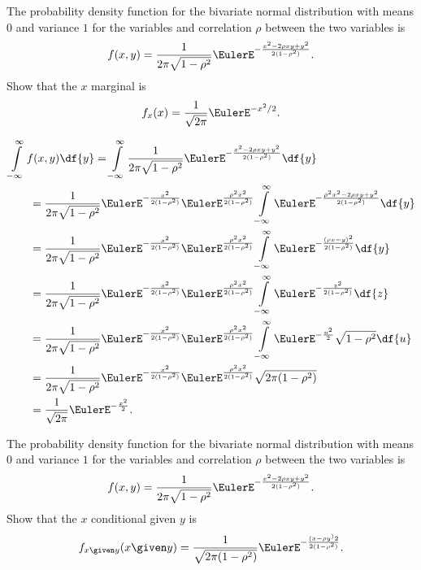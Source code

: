 \documentclass[12pt]{article}
\begin{document}
\renewcommand{\theexerciseseries}{}
\renewcommand{\theexercise}{\arabic{exercise}}

\begin{exercise}
    The probability density function for the bivariate normal
    distribution with means \( 0 \) and variance \( 1 \) for the
    variables and correlation \( \rho \) between the two variables is
    \[
        f(x, y) = \frac{1}{2\pi \sqrt{1 - \rho^2}} \EulerE^{- \frac{x^2
        - 2 \rho x y + y^2}{2(1-\rho^2)}}.
    \] Show that the \( x \) marginal is
    \[
        f_{x}(x) = \frac{1}{\sqrt{2\pi}} \EulerE^{-x^2/2}.
    \]
\end{exercise}
\begin{solution}
    \begin{align*}
        &\int\limits_{-\infty}^{\infty}f(x, y) \df{y} = \int\limits_{-\infty}^
        {\infty}\frac{1}{2\pi \sqrt{1 - \rho^2}} \EulerE^{- \frac{x^2 -
        2 \rho x y + y^2}{2(1-\rho^2)}} \df{y} \\
        &\qquad= \frac{1}{2\pi \sqrt{1 - \rho^2}} \EulerE^{- \frac{x^2}{2
        (1-\rho^2)}} \EulerE^{\frac{\rho^2 x^2}{2(1-\rho^2)}} \int\limits_
        {-\infty}^{\infty} \EulerE^{- \frac{\rho^2 x^2- 2 \rho x y + y^2}
        {2(1-\rho^2)}} \df {y} \\
        &\qquad= \frac{1}{2\pi \sqrt{1 - \rho^2}} \EulerE^{- \frac{x^2}{2
        (1-\rho^2)}} \EulerE^{\frac{\rho^2 x^2}{2(1-\rho^2)}} \int\limits_
        {-\infty}^{\infty} \EulerE^{- \frac{(\rho x - y)^2}{2(1-\rho^2)}}
        \df{y} \\
        &\qquad= \frac{1}{2\pi \sqrt{1 - \rho^2}} \EulerE^{- \frac{x^2}{2
        (1-\rho^2)}} \EulerE^{\frac{\rho^2 x^2}{2(1-\rho^2)}} \int\limits_
        {-\infty}^{\infty} \EulerE^{- \frac{z^2}{2(1-\rho^2)}} \df{z} \\
        &\qquad= \frac{1}{2\pi \sqrt{1 - \rho^2}} \EulerE^{- \frac{x^2}{2
        (1-\rho^2)}} \EulerE^{\frac{\rho^2 x^2}{2(1-\rho^2)}} \int\limits_
        {-\infty}^{\infty} \EulerE^{- \frac{u^2}{2}} \sqrt{1-\rho^2}\df{u}
        \\
        &\qquad= \frac{1}{2\pi \sqrt{1 - \rho^2}} \EulerE^{- \frac{x^2}{2
        (1-\rho^2)}} \EulerE^{\frac{\rho^2 x^2}{2(1-\rho^2)}} \sqrt{2\pi
        (1 - \rho^2)} \\
        &\qquad= \frac{1}{\sqrt{2\pi}} \EulerE^{- \frac{x^2}{2}}.
    \end{align*}
\end{solution}
\begin{exercise}
    The probability density function for the bivariate normal
    distribution with means \( 0 \) and variance \( 1 \) for the
    variables and correlation \( \rho \) between the two variables is
    \[
        f(x, y) = \frac{1}{2\pi \sqrt{1 - \rho^2}} \EulerE^{- \frac{x^2
        - 2 \rho x y + y^2}{2(1-\rho^2)}}.
    \] Show that the \( x \) conditional given \( y \) is
    \[
        f_{x \given y}(x \given y) = \frac{1}{\sqrt{2\pi (1 - \rho^2)}}
        \EulerE^{- \frac{(x - \rho y^)2}{2(1-\rho^2)} }.
    \]
\end{exercise}
\end{document}
